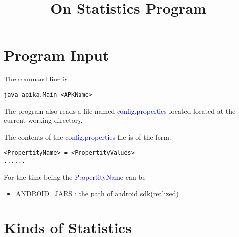 \documentclass{article}
\title{On Statistics Program}
\begin{document}
\tableofcontents
\section{Program Input}
The command line is
\begin{verbatim}
java apika.Main <APKName>
\end{verbatim}
The program also reads a file named 
\textcolor{blue}{config.properties} located 
located at the current working directory. 
\par{
The contents of the \textcolor{blue}{config.properties} 
file is of the form.
\begin{verbatim}
<PropertityName> = <PropertityValues>
......
\end{verbatim}
For the time being the \textcolor{blue}{PropertityName} can be
\begin{itemize}
	\item ANDROID\_JARS : the path of android sdk(realized)
\end{itemize}
}

\section{Kinds of Statistics}
\end{document}
